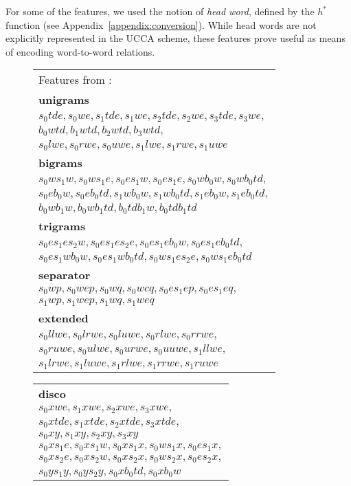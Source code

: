 \documentclass[11pt,a4paper]{article}
\begin{document}
For some of the features, we used the notion of \textit{head word},
defined by the $h^*$ function (see Appendix~\ref{appendix:conversion}).
While head words are not explicitly represented in the UCCA scheme, these
features prove useful as means of encoding word-to-word relations.

\begin{figure*}
\centering
\begin{adjustbox}{margin=3pt,frame}
\begin{tabular}{l}
{\footnotesize Features from \cite{zhang2009transition}:} \\
\textbf{unigrams} \\
$s_0tde, s_0we, s_1tde, s_1we, s_2tde, s_2we, s_3tde, s_3we,$ \\
$b_0wtd, b_1wtd, b_2wtd, b_3wtd,$ \\
$s_0lwe, s_0rwe, s_0uwe, s_1lwe, s_1rwe, s_1uwe$ \\
\textbf{bigrams} \\
$s_0ws_1w, s_0ws_1e, s_0es_1w, s_0es_1e, s_0wb_0w, s_0wb_0td,$ \\
$s_0eb_0w, s_0eb_0td, s_1wb_0w, s_1wb_0td, s_1eb_0w, s_1eb_0td,$ \\
$b_0wb_1w, b_0wb_1td, b_0tdb_1w, b_0tdb_1td$ \\
\textbf{trigrams} \\
$s_0es_1es_2w, s_0es_1es_2e, s_0es_1eb_0w, s_0es_1eb_0td,$ \\
$s_0es_1wb_0w, s_0es_1wb_0td, s_0ws_1es_2e, s_0ws_1eb_0td$ \\
\textbf{separator} \\
$s_0wp, s_0wep, s_0wq, s_0wcq, s_0es_1ep, s_0es_1eq,$ \\
$s_1wp, s_1wep, s_1wq, s_1weq$ \\

\textbf{extended} \footnotesize \cite{zhu2013fast} \\
$s_0llwe, s_0lrwe, s_0luwe, s_0rlwe, s_0rrwe,$ \\
$s_0ruwe, s_0ulwe, s_0urwe, s_0uuwe, s_1llwe,$ \\
$s_1lrwe, s_1luwe, s_1rlwe, s_1rrwe, s_1ruwe$ \\
\end{tabular}
\begin{tabular}{l}
\textbf{disco} \footnotesize \cite{maier2015discontinuous} \\
$s_0xwe, s_1xwe, s_2xwe, s_3xwe,$ \\
$s_0xtde, s_1xtde, s_2xtde, s_3xtde,$ \\
$s_0xy, s_1xy, s_2xy, s_3xy$ \\
$s_0xs_1e, s_0xs_1w, s_0xs_1x, s_0ws_1x, s_0es_1x,$ \\
$s_0xs_2e, s_0xs_2w, s_0xs_2x, s_0ws_2x, s_0es_2x,$ \\
$s_0ys_1y, s_0ys_2y, s_0xb_0td, s_0xb_0w$ \\


\end{tabular}
\end{adjustbox}
\end{figure*}
\end{document}
